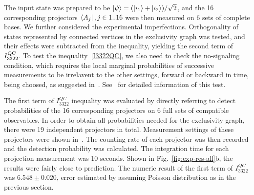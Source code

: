 \documentclass[pra,letterpaper,english,preprint,nofootinbib,aps,superscriptaddress,showkeys]{revtex4-1}
\theoremstyle{definition}
\theoremstyle{remark}
\newcommand{\add}[1]{\textcolor{zhliu}{#1}}
\newcommand\delete{\bgroup\markoverwith{\textcolor{zhliu}{\rule[0.5ex]{2pt}{0.8pt}}}\ULon}
\newcommand{\add}[1]{#1}
\newcommand{\delete}[1]{\ignorespaces}
\begin{document}
 The input state was prepared to be $\ket{\psi} = (\ket{i_1}+\ket{i_2})/\sqrt{2}$, and the 16 corresponding projectors $\bra{A_j}, j\in1..16$ were then measured on 6 sets of complete bases.
 We further considered the experimental imperfections. Orthogonality of states represented by connected vertices in the exclusivity graph was tested, and their effects were subtracted from the inequality, yielding the second term of $I_{3322}^{\rm QC}$. 
 To test the inequality~\ref{I3322QC}, we also need to check the no-signaling condition, \add{which requires the local marginal probabilities of successive measurements to be irrelavent to the other settings, forward or backward in time, being choosed, as suggested in~\cite{cabello16}.} See~\cite{SM} for detailed information of this test.

 The first term of $I_{3322}^{QC}$ inequality was evaluated by directly referring to detect probabilities of the 16 corresponding projectors on $6$ full sets of compatible observables. In order to obtain all probabilities needed for the exclusivity graph, there were 19 independent projectors in total.
 Measurement settings of these projectors were shown in~\cite{SM}.
 The counting rate of each projector was then recorded and the detection probability was calculated. The integration time for each projection measurement was 10 seconds. Shown in Fig.~\ref{fig:exp-res-all}b, the results were fairly close to prediction.
 The numeric result of the first term of $I_{3322}^{QC}$ was $6.548 \pm 0.020$, error estimated by assuming Poisson distribution as \delete{was done} in the previous section.

\iffalse
\end{document}
